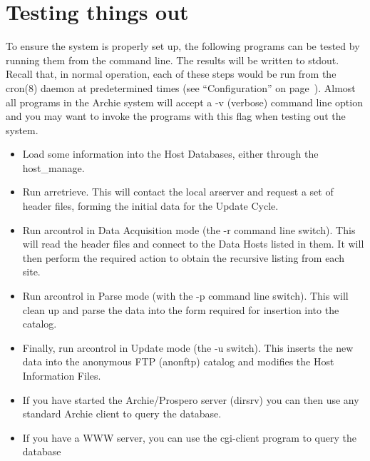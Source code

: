 \section{Testing things out}
To ensure the system is properly set up, the following programs can be tested
by running them from the command line. The results will be written to
stdout. Recall that, in normal operation, each of these steps would be run
from the cron(8) daemon at predetermined times (see ``Configuration'' on
page~\pageref{sec:configuration}). Almost all programs in the Archie system
will accept a -v (verbose) command line option and you may want to invoke the
programs with this flag when testing out the system.



\begin{itemize}
\item
Load some information into the Host Databases, either through the
host\_manage.

\item
Run arretrieve. This will contact the local arserver and request a set of
header files, forming the initial data for the Update Cycle.

\item
Run arcontrol in Data Acquisition mode (the -r command line switch). This
will read the header files and connect to the Data Hosts listed in them. It
will then perform the required action to obtain the recursive listing from
each site.

\item
Run arcontrol in Parse mode (with the -p command line switch). This will
clean up and parse the data into the form required for insertion into the
catalog.

\item
Finally, run arcontrol in Update mode (the -u switch). This inserts the new
data into the anonymous FTP (anonftp) catalog and modifies the Host
Information Files.

\item
If you have started the Archie/Prospero server (dirsrv) you can then use any
standard Archie client to query the database. 

\item
If you have a WWW server, you can use the cgi-client program to query the
database
\end{itemize}



